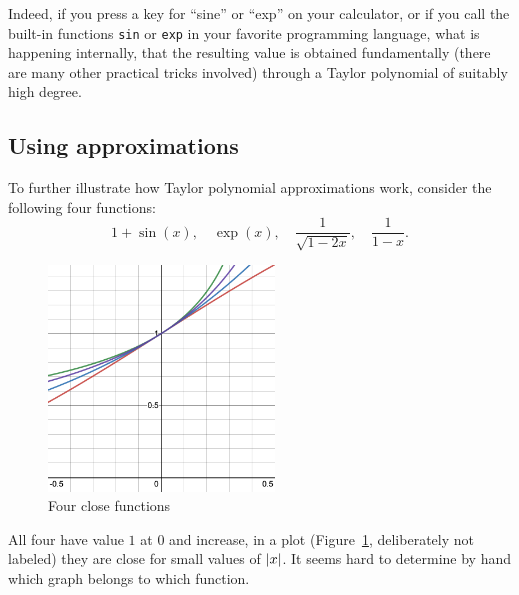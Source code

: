 Indeed, if you press a key for ``sine'' or ``exp'' on your calculator, or if
you call the built-in functions \verb+sin+ or \verb+exp+ in your favorite
programming language, what is happening internally, that the resulting value
is obtained fundamentally (there are many other practical tricks
involved) through a Taylor polynomial of suitably high degree.

\subsection{Using approximations}

To further illustrate how Taylor polynomial approximations work, consider
the following four functions:
\[
1+\sin(x),\quad \exp(x), \quad \frac{1}{\sqrt{1-2x}}, \quad \frac{1}{1-x}.
\]
\begin{figure}
\begin{center}
\includegraphics[width=6cm]{pic/fourtayapprox.png}
\end{center}
\caption{Four close functions}
\label{figfourtayapprox}
\end{figure}
All four have value $1$ at $0$ and increase, in a plot
(Figure~\ref{figfourtayapprox}, deliberately not labeled)
they are close for small values of $\left|x\right|$. It seems hard to determine by
hand which graph belongs to which function.

